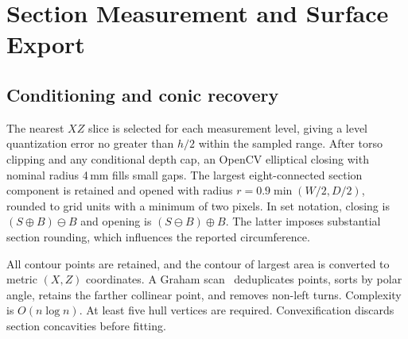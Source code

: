 \documentclass[11pt,a4paper]{article}
\begin{document}
\section{Section Measurement and Surface Export}
\subsection{Conditioning and conic recovery}
The nearest $XZ$ slice is selected for each measurement level, giving a level quantization error no greater than $h/2$ within the sampled range. After torso clipping and any conditional depth cap, an OpenCV elliptical closing with nominal radius 4\,mm fills small gaps. The largest eight-connected section component is retained and opened with radius $r=0.9\min(W/2,D/2)$, rounded to grid units with a minimum of two pixels. In set notation, closing is $(S\oplus B)\ominus B$ and opening is $(S\ominus B)\oplus B$. The latter imposes substantial section rounding, which influences the reported circumference.

All contour points are retained, and the contour of largest area is converted to metric $(X,Z)$ coordinates. A Graham scan~\cite{graham1972efficient} deduplicates points, sorts by polar angle, retains the farther collinear point, and removes non-left turns. Complexity is $O(n\log n)$. At least five hull vertices are required. Convexification discards section concavities before fitting.
\end{document}
